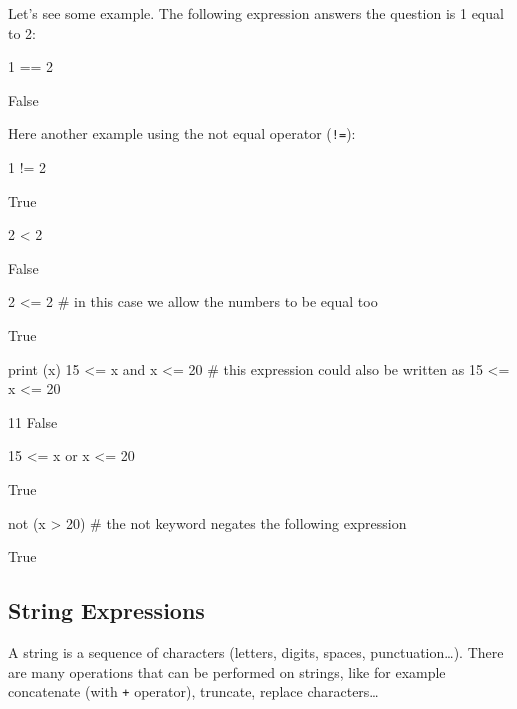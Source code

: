 Let's see some example. The following expression answers the question is 1 equal to 2:

\begin{ipython}
1 == 2
\end{ipython}
\begin{ioutput}
False
\end{ioutput}

Here another example using the not equal operator (\texttt{!=}):

\begin{ipython}
1 != 2
\end{ipython}
\begin{ioutput}
True
\end{ioutput}
\begin{ipython}
2 < 2
\end{ipython}
\begin{ioutput}
False
\end{ioutput}
\begin{ipython}
2 <= 2 # in this case we allow the numbers to be equal too 
\end{ipython}
\begin{ioutput}
True
\end{ioutput}
\begin{ipython}
print (x)
15 <= x and x <= 20 # this expression could also be written as 15 <= x <= 20
\end{ipython}
\begin{ioutput}
11
False
\end{ioutput}
\begin{ipython}
15 <= x or x <= 20 
\end{ipython}
\begin{ioutput}
True
\end{ioutput}
\begin{ipython}
not (x > 20) # the not keyword negates the following expression 
\end{ipython}
\begin{ioutput}
True
\end{ioutput}

\subsection{String Expressions}\label{string-expressions}

A string is a sequence of characters (letters, digits, spaces, punctuation\ldots). There are many operations that can be performed on strings, like for example concatenate (with \texttt{+} operator), truncate, replace characters\ldots

